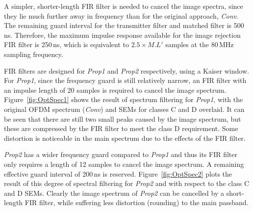 A simpler, shorter-length FIR filter is needed to cancel the image spectra, since they lie much further away in frequency than for the original approach, \emph{Conv}.
The remaining guard interval for the transmitter filter and matched filter is 500\,ns.
Therefore, the maximum impulse response available for the image rejection FIR filter is 250\,ns, which is equivalent to $2.5 \times M.L'$ samples at the 80\,MHz sampling frequency.

FIR filters are designed for \emph{Prop1} and \emph{Prop2} respectively, using a Kaiser window. For \emph{Prop1}, since the frequency guard is still relatively narrow, an FIR filter with an impulse length of 20 samples is required to cancel the image spectrum.
Figure~\ref{fig:OptSpec1} shows the result of spectrum filtering for \emph{Prop1}, with the original OFDM spectrum (\emph{Conv}) and SEMs for classes C and D overlaid.
It can be seen that there are still two small peaks caused by the image spectrum, but these are compressed by the FIR filter to meet the class D requirement.
Some distortion is noticeable in the main spectrum due to the effects of the FIR filter.

\emph{Prop2} has a wider frequency guard compared to \emph{Prop1} and thus its FIR filter only requires a length of 12 samples to cancel the image spectrum. A remaining effective guard interval of 200\,ns is reserved.
Figure~\ref{fig:OptSpec2} plots the result of this degree of spectral filtering for \emph{Prop2} and with respect to the class C and D SEMs.
Clearly the image spectrum of \emph{Prop2} can be cancelled by a short-length FIR filter, while suffering less distortion (rounding) to the main passband.

